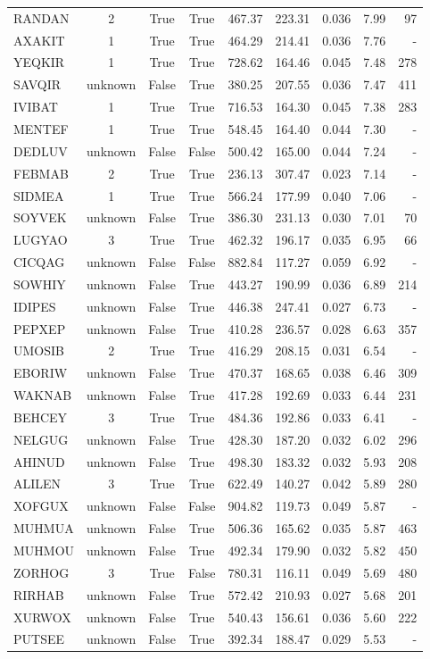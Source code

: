 \begin{scriptsize}
\begin{longtable}{l c c c r r r r r}
RANDAN & 2 & True & True & 467.37 & 223.31 & 0.036 & 7.99 & 97 \\
AXAKIT & 1 & True & True & 464.29 & 214.41 & 0.036 & 7.76 & - \\
YEQKIR & 1 & True & True & 728.62 & 164.46 & 0.045 & 7.48 & 278 \\
SAVQIR & unknown & False & True & 380.25 & 207.55 & 0.036 & 7.47 & 411 \\
IVIBAT & 1 & True & True & 716.53 & 164.30 & 0.045 & 7.38 & 283 \\
MENTEF & 1 & True & True & 548.45 & 164.40 & 0.044 & 7.30 & - \\
DEDLUV & unknown & False & False & 500.42 & 165.00 & 0.044 & 7.24 & - \\
FEBMAB & 2 & True & True & 236.13 & 307.47 & 0.023 & 7.14 & - \\
SIDMEA & 1 & True & True & 566.24 & 177.99 & 0.040 & 7.06 & - \\
SOYVEK & unknown & False & True & 386.30 & 231.13 & 0.030 & 7.01 & 70 \\
LUGYAO & 3 & True & True & 462.32 & 196.17 & 0.035 & 6.95 & 66 \\
CICQAG & unknown & False & False & 882.84 & 117.27 & 0.059 & 6.92 & - \\
SOWHIY & unknown & False & True & 443.27 & 190.99 & 0.036 & 6.89 & 214 \\
IDIPES & unknown & False & True & 446.38 & 247.41 & 0.027 & 6.73 & - \\
PEPXEP & unknown & False & True & 410.28 & 236.57 & 0.028 & 6.63 & 357 \\
UMOSIB & 2 & True & True & 416.29 & 208.15 & 0.031 & 6.54 & - \\
EBORIW & unknown & False & True & 470.37 & 168.65 & 0.038 & 6.46 & 309 \\
WAKNAB & unknown & False & True & 417.28 & 192.69 & 0.033 & 6.44 & 231 \\
BEHCEY & 3 & True & True & 484.36 & 192.86 & 0.033 & 6.41 & - \\
NELGUG & unknown & False & True & 428.30 & 187.20 & 0.032 & 6.02 & 296 \\
AHINUD & unknown & False & True & 498.30 & 183.32 & 0.032 & 5.93 & 208 \\
ALILEN & 3 & True & True & 622.49 & 140.27 & 0.042 & 5.89 & 280 \\
XOFGUX & unknown & False & False & 904.82 & 119.73 & 0.049 & 5.87 & - \\
MUHMUA & unknown & False & True & 506.36 & 165.62 & 0.035 & 5.87 & 463 \\
MUHMOU & unknown & False & True & 492.34 & 179.90 & 0.032 & 5.82 & 450 \\
ZORHOG & 3 & True & False & 780.31 & 116.11 & 0.049 & 5.69 & 480 \\
RIRHAB & unknown & False & True & 572.42 & 210.93 & 0.027 & 5.68 & 201 \\
XURWOX & unknown & False & True & 540.43 & 156.61 & 0.036 & 5.60 & 222 \\
PUTSEE & unknown & False & True & 392.34 & 188.47 & 0.029 & 5.53 & - \\
\end{longtable}
\end{scriptsize}
